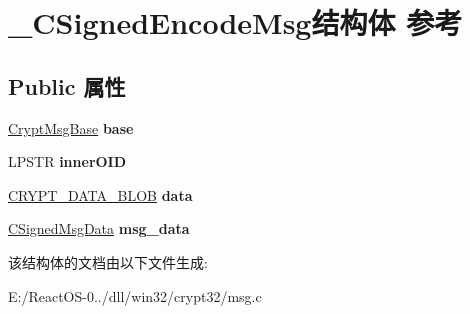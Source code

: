 \hypertarget{struct___c_signed_encode_msg}{}\section{\+\_\+\+C\+Signed\+Encode\+Msg结构体 参考}
\label{struct___c_signed_encode_msg}
\subsection*{Public 属性}
\begin{DoxyCompactItemize}
\item 
\mbox{\label{struct___c_signed_encode_msg_a02b9dbf1b99dc47c7b95c9b2c95e1acd}} 
\hyperlink{struct___crypt_msg_base}{Crypt\+Msg\+Base} {\bfseries base}
\item 
\mbox{\label{struct___c_signed_encode_msg_ad8896622a1edb0de99710dc90a539651}} 
L\+P\+S\+TR {\bfseries inner\+O\+ID}
\item 
\mbox{\label{struct___c_signed_encode_msg_acfba6d192140e31824225d53e916d068}} 
\hyperlink{struct___c_r_y_p_t_o_a_p_i___b_l_o_b}{C\+R\+Y\+P\+T\+\_\+\+D\+A\+T\+A\+\_\+\+B\+L\+OB} {\bfseries data}
\item 
\mbox{\label{struct___c_signed_encode_msg_a0741d346d828d468d733590f440d4a86}} 
\hyperlink{struct___c_signed_msg_data}{C\+Signed\+Msg\+Data} {\bfseries msg\+\_\+data}
\end{DoxyCompactItemize}


该结构体的文档由以下文件生成\+:\begin{DoxyCompactItemize}
\item 
E\+:/\+React\+O\+S-\/0../dll/win32/crypt32/msg.\+c\end{DoxyCompactItemize}
